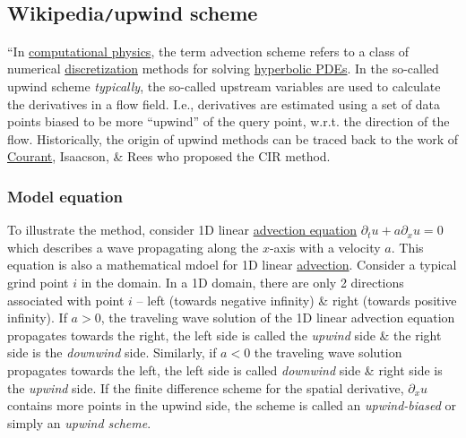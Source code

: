 \documentclass{article}
\begin{document}

\subsection{Wikipedia{\tt/}upwind scheme}
``In \href{https://en.wikipedia.org/wiki/Computational_physics}{computational physics}, the term advection scheme refers to a class of numerical \href{https://en.wikipedia.org/wiki/Discretization}{discretization} methods for solving \href{https://en.wikipedia.org/wiki/Hyperbolic_partial_differential_equation}{hyperbolic PDEs}. In the so-called upwind scheme {\it typically}, the so-called upstream variables are used to calculate the derivatives in a flow field. I.e., derivatives are estimated using a set of data points biased to be more ``upwind'' of the query point, w.r.t. the direction of the flow. Historically, the origin of upwind methods can be traced back to the work of \href{https://en.wikipedia.org/wiki/Richard_Courant}{\sc Courant}, {\sc Isaacson}, \& {\sc Rees} who proposed the CIR method.

\subsubsection{Model equation}
To illustrate the method, consider 1D linear \href{https://en.wikipedia.org/wiki/Advection_equation}{advection equation} $\partial_tu + a\partial_xu = 0$ which describes a wave propagating along the $x$-axis with a velocity $a$. This equation is also a mathematical mdoel for 1D linear \href{https://en.wikipedia.org/wiki/Advection}{advection}. Consider a typical grind point $i$ in the domain. In a 1D domain, there are only 2 directions associated with point $i$ -- left (towards negative infinity) \& right (towards positive infinity). If $a > 0$, the traveling wave solution of the 1D linear advection equation propagates towards the right, the left side is called the {\it upwind} side \& the right side is the {\it downwind} side. Similarly, if $a < 0$ the traveling wave solution propagates towards the left, the left side is called {\it downwind} side \& right side is the {\it upwind} side. If the finite difference scheme for the spatial derivative, $\partial_xu$ contains more points in the upwind side, the scheme is called an {\it upwind-biased} or simply an {\it upwind scheme}.
\end{document}
